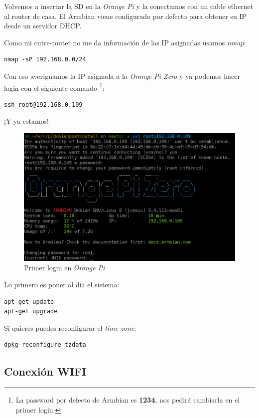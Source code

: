 \documentclass[12pt,spanish,]{scrartcl}
\begin{document}
Volvemos a insertar la SD en la \emph{Orange Pi} y la conectamos con un
cable ethernet al router de casa. El Armbian viene configurado por
defecto para obtener su IP desde un servidor DHCP.

Como mi cutre-router no me da información de las IP asignadas usamos
\emph{nmap}:

\begin{verbatim}
nmap -sP 192.168.0.0/24
\end{verbatim}

Con eso averiguamos la IP asignada a la \emph{Orange Pi Zero} y ya
podemos hacer login con el siguiente comando \footnote{La password por
  defecto de Armbian es \textbf{1234}, nos pedirá cambiarla en el primer
  login.}:

\begin{verbatim}
ssh root@192.168.0.109
\end{verbatim}

¡Y ya estamos!

\begin{figure}[htbp]
\centering
\includegraphics{src/img/OrangePiZero_FirstLogin.png}
\caption{Primer login en \emph{Orange Pi}}
\end{figure}

Lo primero es poner al dia el sistema:

\begin{verbatim}
apt-get update
apt-get upgrade
\end{verbatim}

Si quieres puedes reconfigurar el \emph{time zone}:

\begin{verbatim}
dpkg-reconfigure tzdata
\end{verbatim}

\subsection{Conexión WIFI}\label{conexiuxf3n-wifi}
\end{document}
